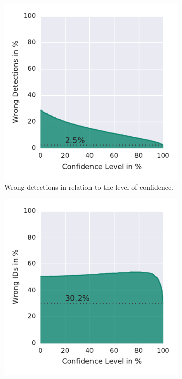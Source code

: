 \begin{figure}
	\centering
	\begin{subfigure}[b]{0.45\textwidth}
		\includegraphics[width=\textwidth]{Figures/confVSdetquality}
		\caption[Wrong Detections]{Wrong detections in relation to the level of confidence.}
		\label{fig:confVSdetquality}
	\end{subfigure}
	\begin{subfigure}[b]{0.45\textwidth}
		\includegraphics[width=\textwidth]{Figures/confVSidsquality}

\end{subfigure}
\end{figure}
